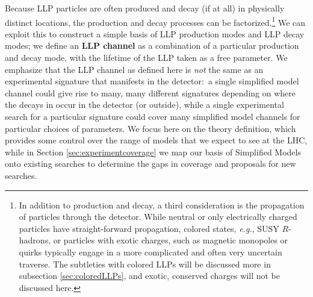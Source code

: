 Because LLP particles are often produced and decay (if at all) in physically distinct locations, the production and decay processes can be factorized.\footnote{In addition to production and decay, a third consideration is the propagation of particles through the detector.  While neutral or only electrically charged particles have straight-forward propagation, colored states, \emph{e.g.}, SUSY $R$-hadrons, or particles with exotic charges, such as magnetic monopoles or quirks typically engage in a more complicated and often very uncertain traverse.  The subtleties with colored LLPs will be discussed more in subsection \ref{sec:coloredLLPs}, and exotic, conserved charges will not be discussed here.}  
We can exploit this to construct a simple basis of LLP production modes and LLP decay modes; we define an {\bf LLP channel} as a combination of a particular production and decay mode, with the lifetime of the LLP taken as a free parameter. We emphasize that the LLP channel as defined here is \emph{not} the same as an experimental signature that manifests in the detector:~a single simplified model channel could give rise to many, many different signatures depending on where the decays in occur in the detector (or outside), while a single experimental search for a particular signature could cover many simplified model channels for particular choices of parameters. We focus here on the theory definition, which provides some control over the range of models that we expect to see at the LHC, while in Section \ref{sec:experimentcoverage} we map our basis of Simplified Models onto existing searches to determine the gaps in coverage and proposals for new searches.


